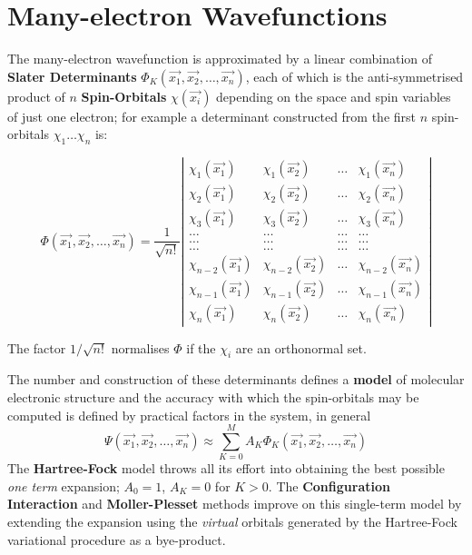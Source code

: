 \section{\sf Many-electron Wavefunctions}
\label{wf}
The many-electron wavefunction is approximated by a linear combination
of {\bf Slater Determinants} 
$\Phi_K ( \vec{x_1}, \vec{x_2}, \ldots , \vec{x_n} )$, 
each of which is the anti-symmetrised
product of $n$ {\bf Spin-Orbitals} $\chi (\vec{x_i})$ depending
on the space and spin variables of just one electron; for example
a determinant constructed from the first $n$ spin-orbitals 
$\chi_1 \ldots \chi_n$ is:
\begin{center}
\[
\Phi (\vec{x_1},\vec{x_2},\ldots , \vec{x_n} ) = 
\frac{1}{\sqrt{n!}}
\left |
\begin{array}{cccc}
\chi_1 (\vec{x_1}) & \chi_1 (\vec{x_2}) & \dots  & \chi_1 (\vec{x_n})  \\
\chi_2 (\vec{x_1}) & \chi_2 (\vec{x_2}) & \dots  & \chi_2 (\vec{x_n})  \\
\chi_3 (\vec{x_1}) & \chi_3 (\vec{x_2}) & \dots  & \chi_3 (\vec{x_n})  \\
\ldots & \ldots & \ldots & \ldots \\
\ldots & \ldots & \ldots & \ldots \\
\ldots & \ldots & \ldots & \ldots \\
\chi_{n-2} (\vec{x_1}) & \chi_{n-2} (\vec{x_2}) & \dots  & 
\chi_{n-2} (\vec{x_n})  \\
\chi_{n-1} (\vec{x_1}) & \chi_{n-1} (\vec{x_2}) & \dots  
& \chi_{n-1} (\vec{x_n})  \\
\chi_n (\vec{x_1}) & \chi_n (\vec{x_2}) & \dots  & \chi_n (\vec{x_n})  
\end{array}
\right |
\]
\end{center}
The factor $1/\sqrt{n!}$ normalises $\Phi$ if the $\chi_i$ are
an orthonormal set.

The number and construction of these determinants defines a {\bf model}
of molecular electronic structure and the accuracy with which
the spin-orbitals may be computed is defined by practical factors in
the system, in general
\begin{equation}
\Psi ( \vec{x_1}, \vec{x_2}, \ldots , \vec{x_n} ) 
\approx \sum_{K=0}^{M} 
{ A_K \Phi_K ( \vec{x_1}, \vec{x_2}, \ldots , \vec{x_n} ) }
\label{wftilde}
\end{equation}
The {\bf Hartree-Fock} model throws all its effort into obtaining the
best possible {\em one term} expansion; $A_0 = 1$, $A_K = 0$ for
$ K > 0 $. The {\bf Configuration Interaction} and
{\bf Moller-Plesset} methods improve on this single-term model by
extending the expansion using the {\em virtual} orbitals generated
by the Hartree-Fock variational procedure as a bye-product.
